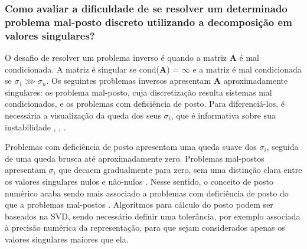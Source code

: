 \subsubsection{Como avaliar a dificuldade de se resolver um determinado problema mal-posto discreto utilizando a decomposição em valores singulares?}
O desafio de resolver um problema inverso é quando a matriz $\mathbf{A}$ é mal condicionada. A matriz é singular se cond($\mathbf{A}$) = $\infty$ e a matriz é mal condicionada se $\sigma_1 \ggg \sigma_n$. Os seguintes problemas inversos apresentam $\mathbf{A}$ aproximadamente singulares: os problema mal-posto, cuja discretização resulta sistemas mal condicionados, e os problemas com deficiência de posto. Para diferenciá-los, é necessária a visualização da queda dos seus $\sigma_i$, que é informativa sobre sua instabilidade \cite[pág. 74]{aster2019parameter}, \cite{hansen2010discrete}, \cite[pág. 45]{Mueller2012}. 

Problemas com deficiência de posto apresentam uma queda suave dos  $\sigma_i$, seguida de uma queda brusca até aproximadamente zero. Problemas mal-postos apresentam $\sigma_i$ que decaem gradualmente para zero, sem uma distinção clara entre os valores singulares nulos e não-nulos \cite[Subseção 7.4]{hansen2010discrete}. Nesse sentido, o conceito de posto numérico acaba sendo mais associado a problemas com deficiência de posto do que a problemas mal-postos \cite[Pág. 2]{Hansen1998}. Algoritmos para cálculo do posto podem ser baseados na SVD, sendo necessário definir uma tolerância, por exemplo associada à precisão numérica da representação, para que sejam considerados apenas os valores singulares maiores que ela. 


